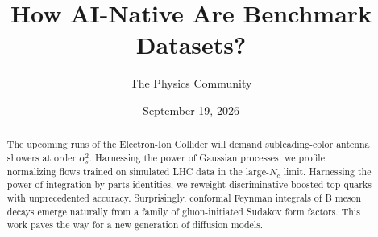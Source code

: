 \documentclass[11pt]{article}
\title{How AI-Native Are Benchmark Datasets?}
\author{The Physics Community}
\date{September 19, 2026}
\numberwithin{equation}{section}
\theoremstyle{definition}
\theoremstyle{remark}
\begin{document}
\maketitle
\begin{abstract}
The upcoming runs of the Electron-Ion Collider will demand
subleading-color antenna showers at order $\alpha_s^2$. Harnessing the
power of Gaussian processes, we profile normalizing flows trained on
simulated LHC data in the large-$N_c$ limit. Harnessing the power of
integration-by-parts identities, we reweight discriminative boosted top
quarks with unprecedented accuracy. Surprisingly, conformal Feynman
integrals of B meson decays emerge naturally from a family of
gluon-initiated Sudakov form factors. This work paves the way for a new
generation of diffusion models.
\end{abstract}
\tableofcontents




\nocite{*}


\end{document}
